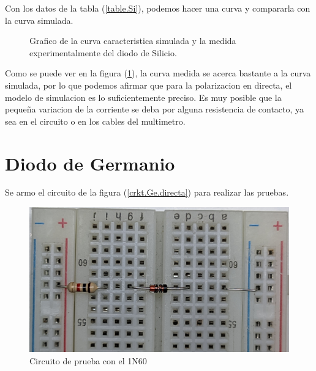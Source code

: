 \documentclass[chaptersright]{informeutn}
\begin{document}
      Con los datos de la tabla (\ref{table.Si}), podemos hacer una curva y compararla con la curva simulada.
      \begin{figure}[!ht]
        \centering
        \caption{Grafico de la curva caracteristica simulada y la medida experimentalmente del diodo de Silicio.}
        \label{graph.comparativa.Si}
      \end{figure}

      Como se puede ver en la figura (\ref{graph.comparativa.Si}), la curva medida se acerca bastante a la curva
      simulada, por lo que podemos afirmar que para la polarizacion en directa, el modelo de simulacion es lo
      suficientemente preciso. Es muy posible que la pequeña variacion de la corriente se deba por alguna resistencia
      de contacto, ya sea en el circuito o en los cables del multimetro.

    \section{Diodo de Germanio}
      Se armo el circuito de la figura (\ref{crkt.Ge.directa}) para realizar las pruebas.
      \begin{figure}[H]
        \centering
        \includegraphics[angle=180, width=.8\textwidth]{pictures/prot_crkt-2.jpg}
        \caption{Circuito de prueba con el 1N60}
        \label{crkt.Ge.prot}
      \end{figure}
\end{document}
